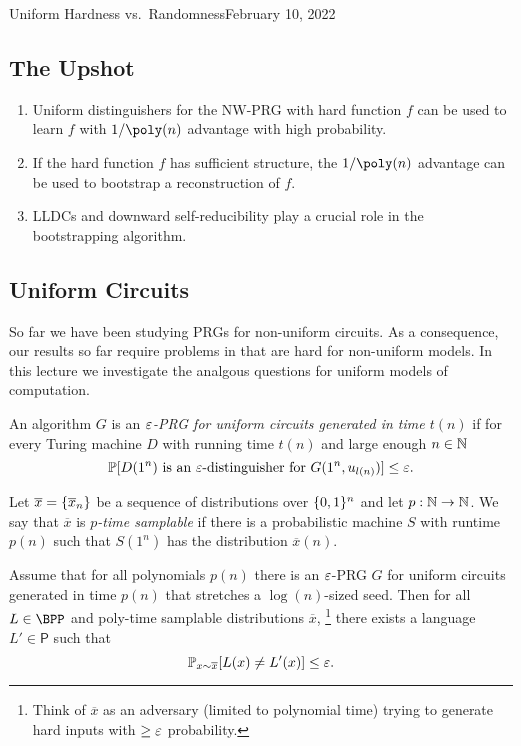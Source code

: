 \begin{lecture}{4}{Uniform Hardness vs.\ Randomness}{February 10, 2022}
\label{lec:04}

\subsection*{The Upshot}

\begin{enumerate}
  \item Uniform distinguishers for the NW-PRG with hard function $f$ can be
    used to learn $f$ with $1/\poly(n)$ advantage with high probability.
  \item If the hard function $f$ has sufficient structure, the $1/\poly(n)$
    advantage can be used to bootstrap a reconstruction of $f$.
  \item LLDCs and downward self-reducibility play a crucial role in the
    bootstrapping algorithm.
\end{enumerate}


\subsection{Uniform Circuits}

So far we have been studying PRGs for non-uniform circuits. As a consequence,
our results so far require problems in \E that are hard for non-uniform models.
In this lecture we investigate the analgous questions for uniform models of
computation.


\begin{definition}
  An algorithm $G$ is an \emph{$\varepsilon$-PRG for uniform circuits generated in
  time $t(n)$} if for every Turing machine $D$ with running time $t(n)$ and
  large enough $n \in \mathbb{N}$
	\[
		\mathbb{P}[D(1^n) \text{ is an $\varepsilon$-distinguisher for } G(1^n, u_{l(n)})] \leq \varepsilon.
	\]
\end{definition}

\begin{definition}
  Let $\overline{x} = \{\overline{x}_n\}$ be a sequence of distributions over
  $\{0, 1\}^n$ and let $p : \mathbb{N} \to \mathbb{N}$. We say that $\overline{x}$ is
  \emph{$p$-time samplable} if there is a probabilistic machine $S$ with
  runtime $p(n)$ such that $S(1^n)$ has the distribution $\overline{x}(n)$.
\end{definition}

\begin{theorem}
  Assume that for all polynomials $p(n)$ there is an $\varepsilon$-PRG $G$ for uniform
  circuits generated in time $p(n)$ that stretches a $\log(n)$-sized seed. Then
  for all $L \in \BPP$ and poly-time samplable distributions $\overline{x}$,%
  \footnote{Think of $\overline{x}$ as an adversary (limited to polynomial
  time) trying to generate hard inputs with $\geq \varepsilon$ probability.} there
  exists a language $L' \in \textsf{P}$ such that
	\[
		\mathbb{P}_{x \sim \overline{x}}[L(x) \neq L'(x)] \leq \varepsilon.
	\]
\end{theorem}


\end{lecture}

